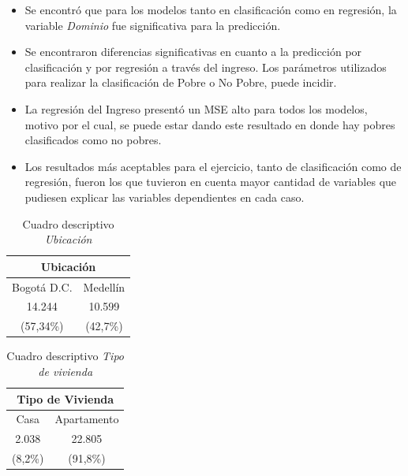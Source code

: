 \documentclass[conference, 10pt]{IEEEtran}
\begin{document}
\begin{itemize}
\item Se encontró que para los modelos tanto en clasificación como en regresión, la variable \textit{Dominio} fue significativa para la predicción.
\item Se encontraron diferencias significativas en cuanto a la predicción por clasificación y por regresión a través del ingreso. Los parámetros utilizados para realizar la clasificación de Pobre o No Pobre, puede incidir.
\item La regresión del Ingreso presentó un MSE alto para todos los modelos, motivo por el cual, se puede estar dando este resultado en donde hay pobres clasificados como no pobres.
\item Los resultados más aceptables para el ejercicio, tanto de clasificación como de regresión, fueron los que tuvieron en cuenta mayor cantidad de variables que pudiesen explicar las variables dependientes en cada caso.
\end{itemize}




\begin{table}[htbp]
\caption{Cuadro descriptivo \textit{Ubicación}}
\begin{center}
\begin{tabular}{|c|c|}
\hline
\multicolumn{2}{|c|}{\textbf{Ubicación}} \\
\cline{1-2} 
\hline
 Bogotá D.C.&Medellín\\
 14.244&10.599\\
 (57,34\%)&(42,7\%)\\
 
	\hline
\end{tabular}
\label{tab_1}
\end{center}
\end{table}

\begin{table}[htbp]
\caption{Cuadro descriptivo \textit{Tipo de vivienda}}
\begin{center}
\begin{tabular}{|c|c|}
\hline
\multicolumn{2}{|c|}{\textbf{Tipo de Vivienda}} \\
\cline{1-2} 
\hline
 Casa&Apartamento\\
 2.038&22.805\\
 (8,2\%)&(91,8\%)\\
 
	\hline
\end{tabular}
\label{tab_2}
\end{center}
\end{table}
\end{document}
